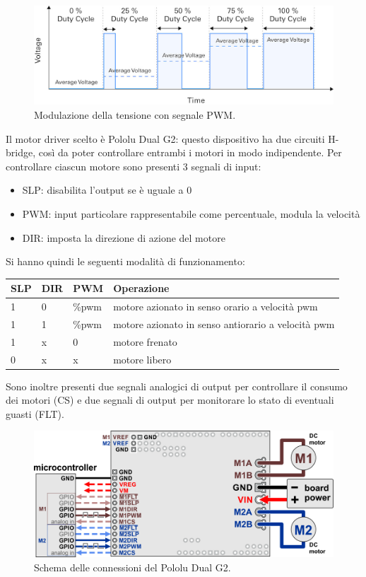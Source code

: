 \begin{figure}[H]
\centering
\includegraphics[scale=1.4]{images/pwm.jpg}
\caption{Modulazione della tensione con segnale PWM.}
\end{figure}


Il motor driver scelto è Pololu Dual G2: questo dispositivo ha due circuiti H-bridge, così da poter controllare entrambi i motori in modo indipendente.
Per controllare ciascun motore sono presenti 3 segnali di input:
\begin{itemize}
    \item SLP: disabilita l'output se è uguale a 0
    \item PWM: input particolare rappresentabile come percentuale, modula la velocità
    \item DIR: imposta la direzione di azione del motore
\end{itemize}

Si hanno quindi le seguenti modalità di funzionamento:
\begin{table}[H]
    \centering
    \begin{tabular}{|l|l|l|l|}
    \hline
    SLP & DIR & PWM & Operazione                            \\ \hline
    1   & 0   & \%pwm & motore azionato in senso orario a velocità pwm \\
    1   & 1   & \%pwm & motore azionato in senso antiorario a velocità pwm         \\
    1   & x   & 0   & motore frenato                        \\
    0   & x   & x   & motore libero                     \\ \hline
    \end{tabular}
\end{table}

Sono inoltre presenti due segnali analogici di output per controllare il consumo dei motori (CS) e due segnali di output per monitorare lo stato di eventuali guasti (FLT).

\begin{figure}[H]
\centering
\includegraphics[scale=1.4]{images/pololu.png}
\caption{Schema delle connessioni del Pololu Dual G2.}
\end{figure}


